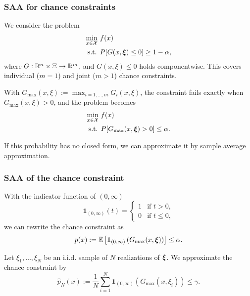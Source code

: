 \documentclass[aspectratio=169]{beamer}
\begin{document}
\begin{frame}
	\frametitle{SAA for chance constraints}
	
	We consider the problem
	\begin{align*}
		\min_{x \in \mathcal{X}}\ & f(x) \\
		\mbox{s.t. } & P[G(x,{\boldsymbol{\xi}}) \leq 0] \geq 1 - \alpha,
	\end{align*}
	where $G: \mathbb{R}^n \times \Xi \rightarrow \mathbb{R}^m$, and $G(x,\xi) \leq 0$ holds componentwise.
	This covers individual ($m = 1$) and joint ($m > 1$) chance constraints.
	
	\mbox{}
	
	With $G_{\max}(x,\xi) := \max_{i = 1,\ldots,m} G_i(x,\xi)$, the constraint fails exactly when $G_{\max}(x,\xi) > 0$, and the problem becomes
	\begin{align*}
		\min_{x \in \mathcal{X}}\ & f(x) \\
		\mbox{s.t. } & P[G_{\max}(x,{\boldsymbol{\xi}}) > 0] \leq \alpha.
	\end{align*}
	
	If this probability has no closed form, we can approximate it by sample average approximation.
	
\end{frame}

\begin{frame}
	\frametitle{SAA of the chance constraint}
	
	With the indicator function of $(0,\infty)$
	\[
	\mathbf{1}_{(0,\infty)}(t) =
	\begin{cases}
		1 & \mbox{if } t > 0,\\
		0 & \mbox{if } t \leq 0,
	\end{cases}
	\]
	we can rewrite the chance constraint as
	\[
	p(x) := {\mathbb{E}}\left[ \mathbf{1}_{(0,\infty)} \left( G_{\max}(x, {\boldsymbol{\xi}}) \right) \right] \leq \alpha.
	\]
	
	Let $\xi_1,\ldots,\xi_N$ be an i.i.d. sample of $N$ realizations of ${\boldsymbol{\xi}}$.
	We approximate the chance constraint by
	\[
	\hat{p}_N(x) := \frac{1}{N} \sum_{i = 1}^N \mathbf{1}_{(0,\infty)} \left( G_{\max}(x, \xi_i) \right) \leq \gamma.
	\]
	
\end{frame}
\end{document}
